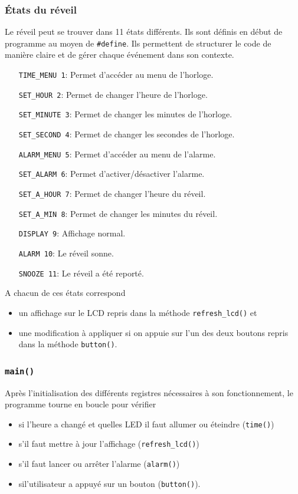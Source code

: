 \documentclass[12pt,a4paper]{article}
\begin{document}
    \subsubsection{\'Etats du réveil}
    Le réveil peut se trouver dans 11 états différents. Ils sont définis en début de programme au moyen de \texttt{\#define}. Ils permettent de structurer le code de manière claire et de gérer chaque événement dans son contexte.
    \begin{itemize}
    \item[\texttt{TIME\_MENU 1}:] Permet d'accéder au menu de l'horloge.
	\item[\texttt{SET\_HOUR 2}:] Permet de changer l'heure de l'horloge.
	\item[\texttt{SET\_MINUTE 3}:] Permet de changer les minutes de l'horloge.
	\item[\texttt{SET\_SECOND 4}:] Permet de changer les secondes de l'horloge.
	\item[\texttt{ALARM\_MENU 5}:] Permet d'accéder au menu de l'alarme.
	\item[\texttt{SET\_ALARM 6}:] Permet d'activer/désactiver l'alarme.
	\item[\texttt{SET\_A\_HOUR 7}:] Permet de changer l'heure du réveil.
	\item[\texttt{SET\_A\_MIN 8}:] Permet de changer les minutes du réveil.
	\item[\texttt{DISPLAY 9}:] Affichage normal.
	\item[\texttt{ALARM 10}:] Le réveil sonne.
	\item[\texttt{SNOOZE 11}:] Le réveil a été reporté.\\
    \end{itemize}
    
    A chacun de ces états correspond 
    \begin{itemize}
    \item un affichage sur le LCD repris dans la méthode \texttt{refresh\_lcd()} et
    \item une modification à appliquer si on appuie sur l'un des deux boutons repris dans la méthode \texttt{button()}.
    \end{itemize} 
    \subsubsection{\texttt{main()}}
    Après l'initialisation des différents registres nécessaires à son fonctionnement, le programme tourne en boucle pour vérifier
    \begin{itemize}
    \item si l'heure a changé et quelles LED il faut allumer ou éteindre (\texttt{time()})
    \item s'il faut mettre à jour l'affichage (\texttt{refresh\_lcd()})
    \item s'il faut lancer ou arrêter l'alarme (\texttt{alarm()})
    \item sil'utilisateur a appuyé sur un bouton (\texttt{button()}).
    \end{itemize}
    
\end{document}
